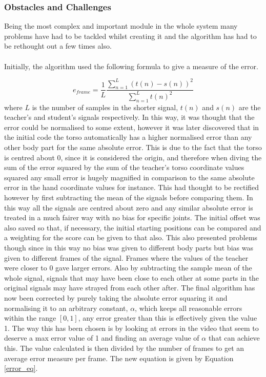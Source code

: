 \documentclass[a4paper]{article}
\begin{document}
\noindent

\subsubsection{Obstacles and Challenges}

\noindent
Being the most complex and important module in the whole system many problems have had to be tackled whilst creating it and the algorithm has had to be rethought out a few times also.\\\\
\noindent
Initially, the algorithm used the following formula to give a measure of the error.

\begin{equation}
e_{frame} = \frac{1}{L} \dfrac{\sum\limits_{n=1}^{L}(t(n)-s(n))^2}{\sum\limits_{n=1}^{L}t(n)^2}
\end{equation}
where $L$ is the number of samples in the shorter signal, $t(n)$ and $s(n)$ are the teacher's and student's signals respectively. In this way, it was thought that the error could be normalised to some extent, however it was later discovered that in the initial code the torso automatically has a higher normalised error than any other body part for the same absolute error. This is due to the fact that the torso is centred about 0, since it is considered the origin, and therefore when diving the sum of the error squared by the sum of the teacher's torso coordinate values squared any small error is hugely magnified in comparison to the same absolute error in the hand coordinate values for instance. This had thought to be rectified however by first subtracting the mean of the signals before comparing them. In this way all the signals are centred about zero and any similar absolute error is treated in a much fairer way with no bias for specific joints. The initial offset was also saved so that, if necessary, the initial starting positions can be compared and a weighting for the score can be given to that also. This also presented problems though since in this way no bias was given to different body parts but bias was given to different frames of the signal. Frames where the values of the teacher were closer to 0 gave larger errors. Also by subtracting the sample mean of the whole signal, signals that may have been close to each other at some parts in the original signals may have strayed from each other after. The final algorithm has now been corrected by purely taking the absolute error squaring it and normalising it to an arbitrary constant, $\alpha$, which keeps all reasonable errors within the range $[0, 1]$, any error greater than this is effectively given the value 1. The way this has been chosen is by looking at errors in the video that seem to deserve a max error value of 1 and finding an average value of $\alpha$ that can achieve this. The value calculated is then divided by the number of frames to get an average error measure per frame. The new equation is given by Equation \eqref{error_eq}.
\end{document}
